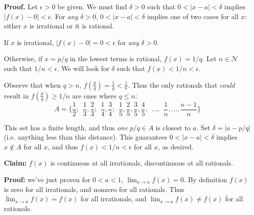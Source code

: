 \vs

\textbf{Proof.} Let $\epsilon>0$ be given. We must find $\delta>0$ such that
$0<|x-a|<\delta$ implies $|f(x)-0|<\epsilon$. For \textit{any}
$\delta>0$, $0<|x-a|<\delta$ implies one of two cases for all $x$: either
$x$ is irrational or it is rational.

\vs

If $x$ is irrational, $|f(x)-0|=0<\epsilon$ for \textit{any} $\delta>0$.

\vs

Otherwise, if $x=p/q$ in the lowest terms is rational, $f(x)=1/q$. Let
$n\in\mathcal{N}$ such that $1/n<\epsilon$. We will look for $\delta$ such that $f(x)<1/n<\epsilon$.

\vs

Observe that when $q>n$, $f(\frac{p}{q})=\frac{1}{q}<\frac{1}{n}$.
Thus the only rationals that \textit{could} result in $f(\frac{p}{q})\geq1/n$ are
ones where $q\leq n$:
\[A=\{\frac{1}{2};\ \ \frac{1}{3},\frac{2}{3};\ \
  \frac{1}{4},\frac{3}{4};\ \
  \frac{1}{5},\frac{2}{5},\frac{3}{5},\frac{4}{5},\ \ \ldots,\ \ \frac{1}{n},\ldots,\frac{n-1}{n}\}\]

This set has a finite length, and thus \textit{one} $p/q\in A$ is
closest to $a$. Set $\delta=|a-p/q|$ (i.e. anything less than this
distance). This guarantees $0<|x-a|<\delta$ implies $x\notin A$ for all $x$, and
thus $f(x)<1/n<\epsilon$ for all $x$, as desired.

\vs

\textbf{Claim:} $f(x)$ is continuous at all irrationals, discontinuous
at all rationals.

\vs

\textbf{Proof:} we've just proven for $0<a<1$, $\lim_{x\to a}f(x)=0$. By
definition $f(x)$ is zero for all irrationals, and nonzero for all
rationals. Thus $\lim_{x\to a}f(x)=f(x)$ for all irrationals, and
$\lim_{x\to a}f(x)\neq f(x)$ for all rationals.


